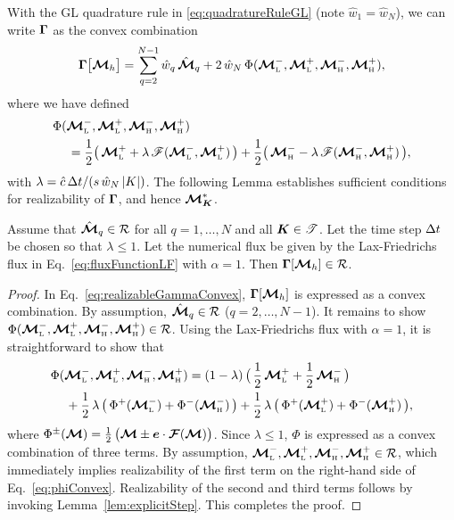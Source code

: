 With the GL quadrature rule in \eqref{eq:quadratureRuleGL} (note $\hat{w}_{1}=\hat{w}_{N}$), we can write $\boldsymbol{\Gamma}$ as the convex combination
\begin{equation}
  \boldsymbol{\Gamma}\big[\boldsymbol{\mathcal{M}}_{h}\big]
  =\sum_{q=2}^{N-1}\hat{w}_{q}\,\hat{\boldsymbol{\mathcal{M}}}_{q}
  +2\,\hat{w}_{N}\,\Phi(\boldsymbol{\mathcal{M}}_{\mbox{\tiny L}}^{-},\boldsymbol{\mathcal{M}}_{\mbox{\tiny L}}^{+},\boldsymbol{\mathcal{M}}_{\mbox{\tiny H}}^{-},\boldsymbol{\mathcal{M}}_{\mbox{\tiny H}}^{+}),
  \label{eq:realizableGammaConvex}
\end{equation}
where we have defined
\begin{align}
  &\Phi(\boldsymbol{\mathcal{M}}_{\mbox{\tiny L}}^{-},\boldsymbol{\mathcal{M}}_{\mbox{\tiny L}}^{+},\boldsymbol{\mathcal{M}}_{\mbox{\tiny H}}^{-},\boldsymbol{\mathcal{M}}_{\mbox{\tiny H}}^{+}) \nonumber \\
  &\hspace{12pt}
  =\frac{1}{2}\big(\,\boldsymbol{\mathcal{M}}_{\mbox{\tiny L}}^{+}+\lambda\,\mathscr{F}(\boldsymbol{\mathcal{M}}_{\mbox{\tiny L}}^{-},\boldsymbol{\mathcal{M}}_{\mbox{\tiny L}}^{+})\,\big)
  +\frac{1}{2}\big(\,\boldsymbol{\mathcal{M}}_{\mbox{\tiny H}}^{-}-\lambda\,\mathscr{F}(\boldsymbol{\mathcal{M}}_{\mbox{\tiny H}}^{-},\boldsymbol{\mathcal{M}}_{\mbox{\tiny H}}^{+})\,\big),
\end{align}
with $\lambda=\hat{c}\,\Delta t/(s\,\hat{w}_{N}\,|K|)$.  
The following Lemma establishes sufficient conditions for realizability of $\boldsymbol{\Gamma}$, and hence $\boldsymbol{\mathcal{M}}_{\boldsymbol{K}}^{*}$.  
\begin{lemma}
  Assume that $\hat{\boldsymbol{\mathcal{M}}}_{q}\in\mathcal{R}$ for all $q=1,\ldots,N$ and all $\boldsymbol{K}\in\mathscr{T}$.  
  Let the time step $\Delta t$ be chosen so that $\lambda\le1$.  
  Let the numerical flux be given by the Lax-Friedrichs flux in Eq.~\eqref{eq:fluxFunctionLF} with $\alpha=1$.  
  Then $\boldsymbol{\Gamma}[\boldsymbol{\mathcal{M}}_{h}]\in\mathcal{R}$.  
\end{lemma}
\begin{proof}
  In Eq.~\eqref{eq:realizableGammaConvex}, $\boldsymbol{\Gamma}[\boldsymbol{\mathcal{M}}_{h}]$ is expressed as a convex combination.  
  By assumption, $\hat{\boldsymbol{\mathcal{M}}}_{q}\in\mathcal{R}$ ($q=2,\ldots,N-1$).  
  It remains to show $\Phi(\boldsymbol{\mathcal{M}}_{\mbox{\tiny L}}^{-},\boldsymbol{\mathcal{M}}_{\mbox{\tiny L}}^{+},\boldsymbol{\mathcal{M}}_{\mbox{\tiny H}}^{-},\boldsymbol{\mathcal{M}}_{\mbox{\tiny H}}^{+})\in\mathcal{R}$.  
  Using the Lax-Friedrichs flux with $\alpha=1$, it is straightforward to show that
  \begin{align}
    &\Phi(\boldsymbol{\mathcal{M}}_{\mbox{\tiny L}}^{-},\boldsymbol{\mathcal{M}}_{\mbox{\tiny L}}^{+},\boldsymbol{\mathcal{M}}_{\mbox{\tiny H}}^{-},\boldsymbol{\mathcal{M}}_{\mbox{\tiny H}}^{+})
    =(1-\lambda)\,\big(\,\frac{1}{2}\,\boldsymbol{\mathcal{M}}_{\mbox{\tiny L}}^{+}+\frac{1}{2}\,\boldsymbol{\mathcal{M}}_{\mbox{\tiny H}}^{-}\,\big) \nonumber \\
    &\hspace{12pt}
    +\frac{1}{2}\,\lambda\,\big(\,\Phi^{+}(\boldsymbol{\mathcal{M}}_{\mbox{\tiny L}}^{-})+\Phi^{-}(\boldsymbol{\mathcal{M}}_{\mbox{\tiny H}}^{-})\,\big)
    +\frac{1}{2}\,\lambda\,\big(\,\Phi^{+}(\boldsymbol{\mathcal{M}}_{\mbox{\tiny L}}^{+})+\Phi^{-}(\boldsymbol{\mathcal{M}}_{\mbox{\tiny H}}^{+})\,\big),
    \label{eq:phiConvex}
  \end{align}
  where $\Phi^{\pm}(\boldsymbol{\mathcal{M}})=\frac{1}{2}\,\big(\boldsymbol{\mathcal{M}}\pm\boldsymbol{e}\cdot\boldsymbol{\mathcal{F}}(\boldsymbol{\mathcal{M}})\big)$.  
  Since $\lambda\le1$, $\Phi$ is expressed as a convex combination of three terms.  
  By assumption, $\boldsymbol{\mathcal{M}}_{\mbox{\tiny L}}^{-},\boldsymbol{\mathcal{M}}_{\mbox{\tiny L}}^{+},\boldsymbol{\mathcal{M}}_{\mbox{\tiny H}}^{-},\boldsymbol{\mathcal{M}}_{\mbox{\tiny H}}^{+}\in\mathcal{R}$, which immediately implies realizability of the first term on the right-hand side of Eq.~\eqref{eq:phiConvex}.  
  Realizability of the second and third terms follows by invoking Lemma~\ref{lem:explicitStep}.  
  This completes the proof.  
\end{proof}